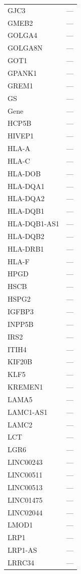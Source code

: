 \begin{longtable}{ll}
  GJC3 & --- \\
  GMEB2 & --- \\
  GOLGA4 & --- \\
  GOLGA8N & --- \\
  GOT1 & --- \\
  GPANK1 & --- \\
  GREM1 & --- \\
  GS & --- \\
  Gene & --- \\
  HCP5B & --- \\
  HIVEP1 & --- \\
  HLA-A & --- \\
  HLA-C & --- \\
  HLA-DOB & --- \\
  HLA-DQA1 & --- \\
  HLA-DQA2 & --- \\
  HLA-DQB1 & --- \\
  HLA-DQB1-AS1 & --- \\
  HLA-DQB2 & --- \\
  HLA-DRB1 & --- \\
  HLA-F & --- \\
  HPGD & --- \\
  HSCB & --- \\
  HSPG2 & --- \\
  IGFBP3 & --- \\
  INPP5B & --- \\
  IRS2 & --- \\
  ITIH4 & --- \\
  KIF20B & --- \\
  KLF5 & --- \\
  KREMEN1 & --- \\
  LAMA5 & --- \\
  LAMC1-AS1 & --- \\
  LAMC2 & --- \\
  LCT & --- \\
  LGR6 & --- \\
  LINC00243 & --- \\
  LINC00511 & --- \\
  LINC00513 & --- \\
  LINC01475 & --- \\
  LINC02044 & --- \\
  LMOD1 & --- \\
  LRP1 & --- \\
  LRP1-AS & --- \\
  LRRC34 & --- \\

\end{longtable}
